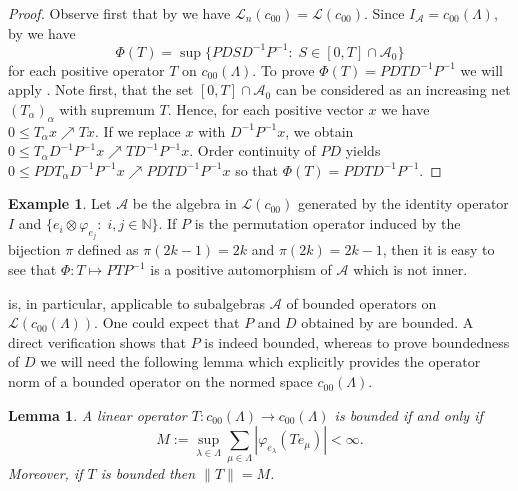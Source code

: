 \documentclass[12pt,reqno]{amsart}
\theoremstyle{plain}
\newtheorem{lemma}[theorem]{Lemma}
\theoremstyle{definition}
\newtheorem{example}[theorem]{Example}
\begin{document}
\begin{proof}
Observe first that by  we have $\mathscr L_n(c_{00})=\mathscr L(c_{00})$.
Since $I_{\mathcal A}=c_{00}(\Lambda)$,
by  we have
$$\Phi(T)=\sup \{PDSD^{-1}P^{-1}:\; S\in [0,T]\cap \mathscr A_0\}$$
for each positive operator $T$ on $c_{00}(\Lambda)$.
To prove $\Phi(T)=PDTD^{-1}P^{-1}$ we will apply \cite[Theorem 1.19]{Aliprantis:06}.
Note first, that the set $[0,T]\cap \mathscr A_0$ can be considered as an increasing net $(T_\alpha)_\alpha$ with supremum $T$.
Hence, for each positive vector $x$ we have
$0\leq T_\alpha x\nearrow Tx$. If we replace $x$ with $D^{-1}P^{-1}x$, we obtain $0\leq T_\alpha D^{-1}P^{-1}x\nearrow TD^{-1}P^{-1}x$.
Order continuity of $PD$ yields $0\leq PDT_\alpha D^{-1}P^{-1}x\nearrow PDTD^{-1}P^{-1}x$ so that $\Phi(T)=PDTD^{-1}P^{-1}$.
\end{proof}

\begin{example}
Let $\mathscr A$ be the algebra in $\mathscr L(c_{00})$ generated by the identity operator $I$ and $\{e_i\otimes \varphi_{e_j}:\; i,j\in \mathbb N\}$.
If $P$ is the permutation operator induced by the bijection $\pi$ defined as $\pi(2k-1)=2k$ and $\pi(2k)=2k-1$, then it is easy to see that $\Phi\colon T\mapsto PTP^{-1}$ is a positive automorphism of $\mathscr A$ which is not inner. 
\end{example}


 is, in particular, applicable to subalgebras $\mathscr A$ of bounded operators on $\mathscr L(c_{00}(\Lambda))$. One could expect that $P$ and $D$ obtained by   are bounded. A direct verification shows that $P$ is indeed bounded, whereas to prove boundedness of $D$ we will need the following lemma which explicitly provides the operator norm of a bounded operator on the normed space $c_{00}(\Lambda)$. 

\begin{lemma}\label{Lc00 description}
A linear operator $T\colon c_{00}(\Lambda)\to c_{00}(\Lambda)$ is bounded if and only if
$$M:=\sup_{\lambda\in\Lambda} \sum_{\mu\in\Lambda} |\varphi_{e_\lambda}(Te_\mu)|<\infty.$$
Moreover, if $T$ is bounded then $\|T\|=M$.
\end{lemma}
\end{document}
